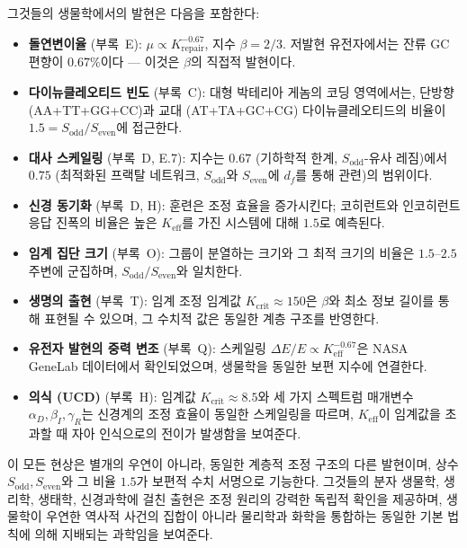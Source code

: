\documentclass[12pt,a4paper]{article}
\theoremstyle{remark}
\begin{document}
	그것들의 생물학에서의 발현은 다음을 포함한다:
	
	\begin{itemize}
		\item \textbf{돌연변이율} (부록~E): \(\mu \propto K_{\mathrm{repair}}^{-0.67}\), 지수 \(\beta = 2/3\). 저발현 유전자에서는 잔류 GC 편향이 \(0.67\%\)이다 — 이것은 \(\beta\)의 직접적 발현이다.
		\item \textbf{다이뉴클레오티드 빈도} (부록~C): 대형 박테리아 게놈의 코딩 영역에서는, 단방향 (AA+TT+GG+CC)과 교대 (AT+TA+GC+CG) 다이뉴클레오티드의 비율이 \(1.5 = S_{\mathrm{odd}}/S_{\mathrm{even}}\)에 접근한다.
		\item \textbf{대사 스케일링} (부록~D, E.7): 지수는 \(0.67\) (기하학적 한계, \(S_{\mathrm{odd}}\)-유사 레짐)에서 \(0.75\) (최적화된 프랙탈 네트워크, \(S_{\mathrm{odd}}\)와 \(S_{\mathrm{even}}\)에 \(d_f\)를 통해 관련)의 범위이다.
		\item \textbf{신경 동기화} (부록~D, H): 훈련은 조정 효율을 증가시킨다; 코히런트와 인코히런트 응답 진폭의 비율은 높은 \(K_{\mathrm{eff}}\)를 가진 시스템에 대해 \(1.5\)로 예측된다.
		\item \textbf{임계 집단 크기} (부록~O): 그룹이 분열하는 크기와 그 최적 크기의 비율은 \(1.5\)--\(2.5\) 주변에 군집하며, \(S_{\mathrm{odd}}/S_{\mathrm{even}}\)와 일치한다.
		\item \textbf{생명의 출현} (부록~T): 임계 조정 임계값 \(K_{\mathrm{crit}} \approx 150\)은 \(\beta\)와 최소 정보 길이를 통해 표현될 수 있으며, 그 수치적 값은 동일한 계층 구조를 반영한다.
		\item \textbf{유전자 발현의 중력 변조} (부록~Q): 스케일링 \(\Delta E/E \propto K_{\mathrm{eff}}^{-0.67}\)은 NASA GeneLab 데이터에서 확인되었으며, 생물학을 동일한 보편 지수에 연결한다.
		\item \textbf{의식 (UCD)} (부록~H): 임계값 \(K_{\mathrm{crit}} \approx 8.5\)와 세 가지 스펙트럼 매개변수 \(\alpha_D,\beta_I,\gamma_R\)는 신경계의 조정 효율이 동일한 스케일링을 따르며, \(K_{\mathrm{eff}}\)이 임계값을 초과할 때 자아 인식으로의 전이가 발생함을 보여준다.
	\end{itemize}
	
	이 모든 현상은 별개의 우연이 아니라, 동일한 계층적 조정 구조의 다른 발현이며, 상수 \(S_{\mathrm{odd}}, S_{\mathrm{even}}\)와 그 비율 \(1.5\)가 보편적 수치 서명으로 기능한다. 그것들의 분자 생물학, 생리학, 생태학, 신경과학에 걸친 출현은 조정 원리의 강력한 독립적 확인을 제공하며, 생물학이 우연한 역사적 사건의 집합이 아니라 물리학과 화학을 통합하는 동일한 기본 법칙에 의해 지배되는 과학임을 보여준다.
	
\end{document}

